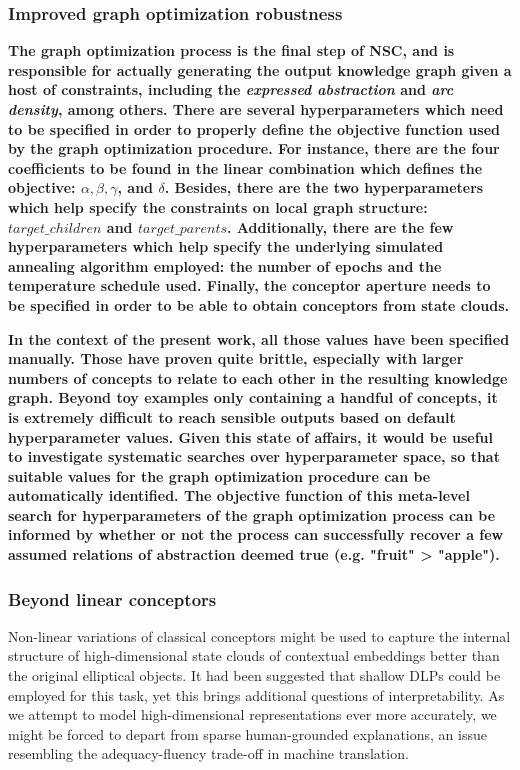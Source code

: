\subsubsection{Improved graph optimization robustness}

\textbf{The graph optimization process is the final step of NSC, and is responsible for actually generating the output knowledge graph given a host of constraints, including the \textit{expressed abstraction} and \textit{arc density}, among others. There are several hyperparameters which need to be specified in order to properly define the objective function used by the graph optimization procedure. For instance, there are the four coefficients to be found in the linear combination which defines the objective: $\alpha, \beta, \gamma$, and $\delta$. Besides, there are the two hyperparameters which help specify the constraints on local graph structure: $target\_children$ and $target\_parents$. Additionally, there are the few hyperparameters which help specify the underlying simulated annealing algorithm employed: the number of epochs and the temperature schedule used. Finally, the conceptor aperture needs to be specified in order to be able to obtain conceptors from state clouds.}

\textbf{In the context of the present work, all those values have been specified manually. Those have proven quite brittle, especially with larger numbers of concepts to relate to each other in the resulting knowledge graph. Beyond toy examples only containing a handful of concepts, it is extremely difficult to reach sensible outputs based on default hyperparameter values. Given this state of affairs, it would be useful to investigate systematic searches over hyperparameter space, so that suitable values for the graph optimization procedure can be automatically identified. The objective function of this meta-level search for hyperparameters of the graph optimization process can be informed by whether or not the process can successfully recover a few assumed relations of abstraction deemed true (e.g. "fruit" > "apple").}

\subsubsection{Beyond linear conceptors}

Non-linear variations of classical conceptors might be used to capture the internal structure of high-dimensional state clouds of contextual embeddings better than the original elliptical objects. It had been suggested that shallow DLPs could be employed for this task, yet this brings additional questions of interpretability. As we attempt to model high-dimensional representations ever more accurately, we might be forced to depart from sparse human-grounded explanations, an issue resembling the adequacy-fluency trade-off in machine translation.

